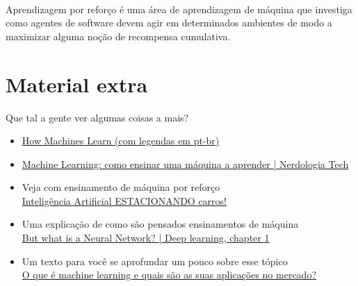\documentclass{article}
\begin{document}
           \paragraph{}Aprendizagem por reforço é uma área de aprendizagem de máquina que investiga como agentes de software devem agir em determinados ambientes de modo a maximizar alguma noção de recompensa cumulativa.


        
            \section*{\centering Material extra}
            
            Que tal a gente ver algumas coisas a mais?
            \begin{itemize}
            
                \item\href{https://www.youtube.com/watch?v=R9OHn5ZF4Uo&t}{​How Machines Learn (com legendas em pt-br)}
            
                \item\href{https://www.youtube.com/watch?v=mhe5e2B9bL8&t=1s}{Machine Learning: como ensinar uma máquina a aprender | Nerdologia Tech}
            
             \item Veja com ensinamento de máquina por reforço \\ %
             \href{https://www.youtube.com/watch?v=r8KWciNmEGw}{Inteligência Artificial ESTACIONANDO carros!}
            
             \item Uma explicação de como são pensados ensinamentos de máquina 
             \\ %
             \href{https://www.youtube.com/watch?v=aircAruvnKk}{But what is a Neural Network? | Deep learning, chapter 1}
            
             \item Um texto para você se aprofundar um pouco sobre esse tópico  
             \\ %
             \href{https://blog.wittel.com/o-que-e-machine-learning/}{O que é machine learning e quais são as suas aplicações no mercado?}
             
            \end{itemize}
\end{document}
